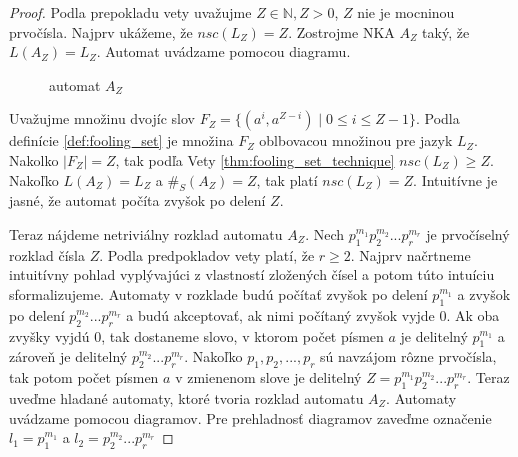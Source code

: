 \begin{proof}
Podla prepokladu vety uvažujme $ Z \in \mathbb{N}, Z > 0 $, $ Z $ nie je mocninou prvočísla. Najprv ukážeme, že $ nsc(L_Z) = Z $. Zostrojme NKA $ A_Z $ taký, že $ L(A_Z)=L_Z $. Automat uvádzame pomocou diagramu.

\begin{figure}[H]
\centering
{}
\caption{automat $ A_Z $} \label{fig:Az}
\end{figure}

Uvažujme množinu dvojíc slov $ F_Z = \lbrace (a^{i},a^{Z-i}) \; | \; 0 \leq i \leq Z-1 \rbrace $. Podla definície \ref{def:fooling_set} je množina $ F_Z $ oblbovacou množinou pre jazyk $ L_Z $. Nakolko $ |F_Z|=Z $, tak podľa Vety \ref{thm:fooling_set_technique} $ nsc(L_Z) \geq Z $. Nakoľko $ L(A_Z) = L_Z $ a $ \#_S(A_Z) = Z $, tak platí $ nsc(L_Z) = Z$. Intuitívne je jasné, že automat \glqq{}počíta zvyšok po delení $ Z $\grqq{}.
\par
Teraz nájdeme netriviálny rozklad automatu $ A_Z $. Nech $ p_{1}^{m_1}p_{2}^{m_2}...p_{r}^{m_r} $ je prvočíselný rozklad čísla $ Z $. Podla predpokladov vety platí, že $ r \geq 2 $. Najprv načrtneme intuitívny pohlad vyplývajúci z vlastností zložených čísel a potom túto intuíciu sformalizujeme. Automaty v rozklade budú počítať zvyšok po delení $ p_{1}^{m_1} $ a zvyšok po delení $p_{2}^{m_2}...p_{r}^{m_r} $ a budú akceptovať, ak nimi počítaný zvyšok vyjde 0. Ak oba zvyšky vyjdú 0, tak dostaneme slovo, v ktorom počet písmen $ a $ je delitelný $ p_{1}^{m_1} $ a zároveň je delitelný $p_{2}^{m_2}...p_{r}^{m_r} $. Nakoľko $ p_1, p_2,...,p_r $ sú navzájom rôzne prvočísla, tak potom počet písmen $ a $ v zmienenom slove je delitelný $ Z=p_{1}^{m_1}p_{2}^{m_2}...p_{r}^{m_r} $. Teraz uveďme hladané automaty, ktoré tvoria rozklad automatu $ A_Z $. Automaty uvádzame pomocou diagramov. Pre prehladnosť diagramov zaveďme označenie $ l_1 = p_{1}^{m_1} $ a $ l_2 = p_{2}^{m_2}...p_{r}^{m_r} $


\end{proof}
